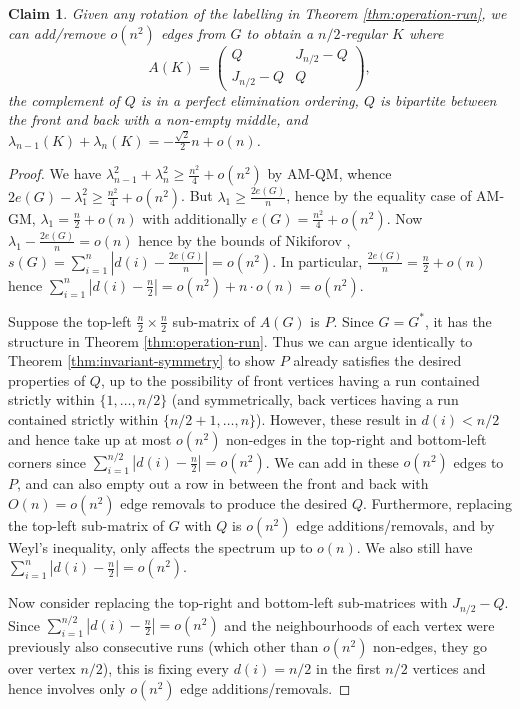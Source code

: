 \documentclass[11pt]{article}
\newtheorem{clm}[thm]{Claim}
\begin{document}
\begin{clm}\label{clm:close-symmetry}
    Given any rotation of the labelling in Theorem \ref{thm:operation-run}, we can add/remove $o(n^2)$ edges from $G$ to obtain a $n/2$-regular $K$ where
    \[A(K) = \begin{pmatrix}
        Q & J_{n/2} - Q \\
        J_{n/2} - Q & Q
    \end{pmatrix},\]
    the complement of $Q$ is in a perfect elimination ordering, $Q$ is bipartite between the front and back with a non-empty middle, and $\lambda_{n-1}(K) + \lambda_n(K) = -\frac{\sqrt{2}}{2} n + o(n)$. 
\end{clm}
\begin{proof}
    We have $\lambda_{n-1}^2 + \lambda_n^2 \ge \frac{n^2}{4} + o(n^2)$ by AM-QM, whence $2e(G) - \lambda_1^2 \ge \frac{n^2}4 + o(n^2)$. But $\lambda_1 \ge \frac{2e(G)}{n}$, hence by the equality case of AM-GM, $\lambda_1 = \frac{n}{2} + o(n)$ with additionally $e(G) = \frac{n^2}{4} + o(n^2)$. Now $\lambda_1 - \frac{2e(G)}{n} = o(n)$ hence by the bounds of Nikiforov \cite{nikiforov2007nordhaus}, $s(G) = \sum_{i = 1}^n |d(i) - \frac{2e(G)}{n}| = o(n^2)$. In particular, $\frac{2e(G)}{n} = \frac{n}{2} + o(n)$ hence $\sum_{i = 1}^n |d(i) - \frac{n}{2}| = o(n^2) + n \cdot o(n) = o(n^2)$. 

    Suppose the top-left $\frac{n}{2} \times \frac{n}{2}$ sub-matrix of $A(G)$ is $P$. Since $G = G^*$, it has the structure in Theorem \ref{thm:operation-run}. Thus we can argue identically to Theorem \ref{thm:invariant-symmetry} to show $P$ already satisfies the desired properties of $Q$, up to the possibility of front vertices having a run contained strictly within $\{1, \dots, n/2\}$ (and symmetrically, back vertices having a run contained strictly within $\{n/2+1, \dots, n\}$). However, these result in $d(i) < n/2$ and hence take up at most $o(n^2)$ non-edges in the top-right and bottom-left corners since $\sum_{i = 1}^{n/2} |d(i) - \frac{n}{2}| = o(n^2)$. We can add in these $o(n^2)$ edges to $P$, and can also empty out a row in between the front and back with $O(n) = o(n^2)$ edge removals to produce the desired $Q$. Furthermore, replacing the top-left sub-matrix of $G$ with $Q$ is $o(n^2)$ edge additions/removals, and by Weyl's inequality, only affects the spectrum up to $o(n)$. We also still have $\sum_{i = 1}^{n} |d(i) - \frac{n}{2}| = o(n^2)$.

    Now consider replacing the top-right and bottom-left sub-matrices with $J_{n/2} - Q$. Since $\sum_{i = 1}^{n/2} |d(i) - \frac{n}{2}| = o(n^2)$ and the neighbourhoods of each vertex were previously also consecutive runs (which other than $o(n^2)$ non-edges, they go over vertex $n/2$), this is fixing every $d(i) = n/2$ in the first $n/2$ vertices and hence involves only $o(n^2)$ edge additions/removals.


\end{proof}
\end{document}
